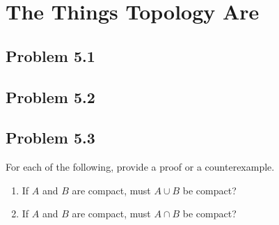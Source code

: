 \documentclass[12pt]{report}
\begin{document}
\renewcommand\qedsymbol{OE$\Delta$}
\newcommand{\abs}[1]{\left| #1 \right|}
\newcommand{\andtxt}{\text{ and }}
\newcommand{\Int}{\text{Int}}
\newcommand{\Ext}{\text{Ext}}
\newcommand{\mathif}{\text{if }}
\newcommand{\seq}[2][n]{\ensuremath{(#2 _{#1})}}

\tableofcontents
\pagebreak

\setcounter{chapter}{4}
\chapter{The Things Topology Are}

\section{Problem 5.1}

\section{Problem 5.2}

\pagebreak

\section{Problem 5.3}
    For each of the following, provide a proof or a  counterexample. 
    \begin{enumerate}[label=(\alph*)]
        \item   If $A$ and $B$ are compact, must $A \cup B$ be compact?
        \item   If $A$ and $B$ are compact, must $A \cap B$ be compact?
    \end{enumerate}
\end{document}
